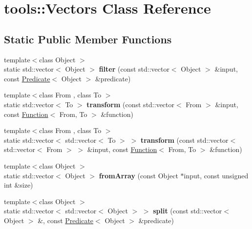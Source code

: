 \hypertarget{classtools_1_1Vectors}{}\section{tools\+:\+:Vectors Class Reference}
\label{classtools_1_1Vectors}
\subsection*{Static Public Member Functions}
\begin{DoxyCompactItemize}
\item 
{\footnotesize template$<$class Object $>$ }\\static std\+::vector$<$ Object $>$ {\bfseries filter} (const std\+::vector$<$ Object $>$ \&input, const \hyperlink{classtools_1_1Predicate}{Predicate}$<$ Object $>$ \&predicate)\hypertarget{classtools_1_1Vectors_a4684424c17b7a19fd89be6fb2329c079}{}\label{classtools_1_1Vectors_a4684424c17b7a19fd89be6fb2329c079}

\item 
{\footnotesize template$<$class From , class To $>$ }\\static std\+::vector$<$ To $>$ {\bfseries transform} (const std\+::vector$<$ From $>$ \&input, const \hyperlink{classtools_1_1Function}{Function}$<$ From, To $>$ \&function)\hypertarget{classtools_1_1Vectors_a3d7971caad3b85827b8a8761573b2c5c}{}\label{classtools_1_1Vectors_a3d7971caad3b85827b8a8761573b2c5c}

\item 
{\footnotesize template$<$class From , class To $>$ }\\static std\+::vector$<$ std\+::vector$<$ To $>$ $>$ {\bfseries transform} (const std\+::vector$<$ std\+::vector$<$ From $>$ $>$ \&input, const \hyperlink{classtools_1_1Function}{Function}$<$ From, To $>$ \&function)\hypertarget{classtools_1_1Vectors_aadb7237dedca652e6865723b29930a87}{}\label{classtools_1_1Vectors_aadb7237dedca652e6865723b29930a87}

\item 
{\footnotesize template$<$class Object $>$ }\\static std\+::vector$<$ Object $>$ {\bfseries from\+Array} (const Object $\ast$input, const unsigned int \&size)\hypertarget{classtools_1_1Vectors_a23e39a25362abb6dabdb87ee2b429911}{}\label{classtools_1_1Vectors_a23e39a25362abb6dabdb87ee2b429911}

\item 
{\footnotesize template$<$class Object $>$ }\\static std\+::vector$<$ std\+::vector$<$ Object $>$ $>$ {\bfseries split} (const std\+::vector$<$ Object $>$ \&, const \hyperlink{classtools_1_1Predicate}{Predicate}$<$ Object $>$ \&predicate)\hypertarget{classtools_1_1Vectors_a2da3cb08a1dbd20f5d8b9e7b701a522c}{}\label{classtools_1_1Vectors_a2da3cb08a1dbd20f5d8b9e7b701a522c}


\end{DoxyCompactItemize}
